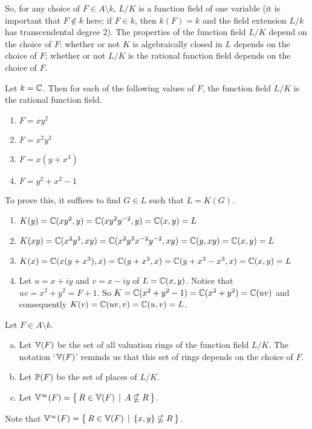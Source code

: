 \begin{remark}
	So, for any choice of $F \in A \setminus  k$, $L/K$ is a function field of one variable
	(it is important that $F \notin  k$ here; 
	if $F \in  k$, then $ k(F)= k$ and the field extension $L/ k$ has transcendental degree 2).
	The properties of the function field $L/K$ depend on the choice of $F$:
	whether or not $K$ is algebraically closed in $L$ depends on the choice of $F$;
	whether or not $L/K$ is the rational function field depends on the choice of $F$.
\end{remark}

\begin{example} \label {ue0982rhr329r23jew}
	Let $k = \mathbb{C}$. Then for each of
	the following values of $F$, the function 
	field $L/K$ is the rational 
	function field.

	\begin{enumerate}
		\item $F = xy^2$
		\item $F = x^2y^3$
		\item $F = x(y+x^3)$ 
		\item $F = y^2 + x^2 - 1$
	\end{enumerate}
	To prove this, it suffices to find $G \in L$ such that $L = K(G)$.
	\begin{enumerate}
		\item $K(y)=\mathbb{C} (xy^2,y) = \mathbb{C} (xy^2y^{-2},y)=\mathbb{C} (x,y) = L$
		\item $K(xy)=\mathbb{C}(x^2y^3,xy)=\mathbb{C}(x^2y^3x^{-2}y^{-2},xy)=\mathbb{C}(y,xy)=\mathbb{C}(x,y)=L$
		\item $K(x)= \mathbb{C}(x(y+x^3),x)=\mathbb{C}(y+x^3,x)=\mathbb{C}(y+x^3 - x^3,x)=\mathbb{C}(x,y)=L$ 
		\item Let $u = x+iy$ and $v=x-iy$ of $L=\mathbb{C}(x,y)$. 
		Notice that $uv=x^2+y^2 = F + 1$.  
		So $K = \mathbb{C}(x^2+y^2-1) = \mathbb{C}(x^2+y^2) = \mathbb{C}(uv)$ and
		consequently $K(v) = \mathbb{C}(uv,v) = \mathbb{C}(u,v) = L$.
	\end{enumerate} 
\end{example}

\begin{notation}
	Let $F \in A \setminus  k$.
	\begin{enumerate}[(a)]
		\item Let $\mathbb{V}(F)$ be the set of all valuation rings of the function field $L/K$.
		The notation `$\mathbb{V}(F)$' reminds us that this set of rings depends on the choice of $F$.
		\item Let $\mathbb{P}(F)$ be the set of places of $L/K$.
		\item Let $\mathbb{V}^\infty(F) = \big\{\, R \in \mathbb{V}(F) \, \mid \, A \nsubseteq R \, \big\}$.
	\end{enumerate}
	Note that $\mathbb{V}^\infty(F) = \big\{\, R \in \mathbb{V}(F) \, \mid \, \{x,y\} \nsubseteq R \, \big\}$.
\end{notation}


